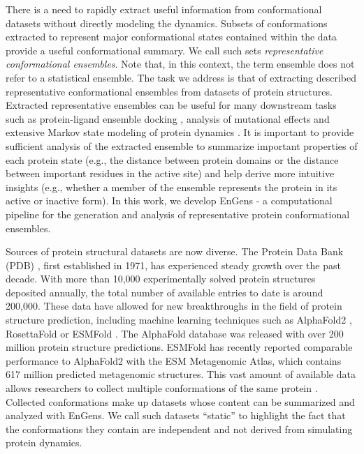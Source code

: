 \documentclass[numsec,webpdf,contemporary,large]{oup-authoring-template}
\theoremstyle{thmstyleone}%
\theoremstyle{thmstyletwo}%
\theoremstyle{thmstylethree}%
\begin{document}
There is a need to rapidly extract useful information from conformational datasets \citep{peng_clustering_2018} without directly modeling the dynamics. Subsets of conformations extracted to represent major conformational states contained within the data provide a useful conformational summary. We call such sets \textit{representative conformational ensembles}. Note that, in this context, the term ensemble does not refer to a statistical ensemble. The task we address is that of extracting described representative conformational ensembles from datasets of protein structures. Extracted representative ensembles can be useful for many downstream tasks such as protein-ligand ensemble docking \citep{hall-swan_dinc-covid_2021}, analysis of mutational effects \citep{kannan_ensemble_2022} and extensive Markov state modeling of protein dynamics \citep{abella_markov_2020, chan_markov_2021}. It is important to provide sufficient analysis of the extracted ensemble to summarize important properties of each protein state (e.g., the distance between protein domains or the distance between important residues in the active site) and help derive more intuitive insights (e.g., whether a member of the ensemble represents the protein in its active or inactive form). In this work, we develop EnGens - a computational pipeline for the generation and analysis of representative protein conformational ensembles.

Sources of protein structural datasets are now diverse. The Protein Data Bank (PDB) \citep{wwpdb_consortium_protein_2019, burley_rcsb_2021}, first established in 1971, has experienced steady growth over the past decade. With more than 10,000 experimentally solved protein structures deposited annually, the total number of available entries to date is around 200,000. These data have allowed for new breakthroughs in the field of protein structure prediction, including machine learning techniques such as AlphaFold2 \citep{jumper_highly_2021}, RosettaFold \citep{baek_accurate_2021} or ESMFold \citep{lin_evolutionary-scale_2022}. The AlphaFold database \citep{varadi_alphafold_2022} was released with over 200 million protein structure predictions. ESMFold has recently reported comparable performance to AlphaFold2 with the ESM Metagenomic Atlas, which contains 617 million predicted metagenomic structures. This vast amount of available data allows researchers to collect multiple conformations of the same protein \citep{takei_how_2022}. Collected conformations make up datasets whose content can be summarized and analyzed with EnGens. We call such datasets ``static'' to highlight the fact that the conformations they contain are independent and not derived from simulating protein dynamics. 
\end{document}
